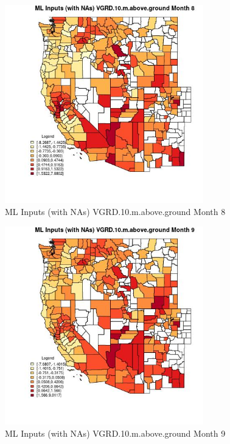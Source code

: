 \begin{figure} 
\centering  
\includegraphics[width=0.77\textwidth]{Code_Outputs/Report_ML_input_PM25_Step4_part_f_de_duplicated_aves_prioritize_24hr_obswNAs_CountyVGRD10mabovegroundmedianMonth8.jpg} 
\caption{\label{fig:Report_ML_input_PM25_Step4_part_f_de_duplicated_aves_prioritize_24hr_obswNAsCountyVGRD10mabovegroundmedianMonth8}ML Inputs (with NAs) VGRD.10.m.above.ground Month 8} 
\end{figure} 
 

\begin{figure} 
\centering  
\includegraphics[width=0.77\textwidth]{Code_Outputs/Report_ML_input_PM25_Step4_part_f_de_duplicated_aves_prioritize_24hr_obswNAs_CountyVGRD10mabovegroundmedianMonth9.jpg} 
\caption{\label{fig:Report_ML_input_PM25_Step4_part_f_de_duplicated_aves_prioritize_24hr_obswNAsCountyVGRD10mabovegroundmedianMonth9}ML Inputs (with NAs) VGRD.10.m.above.ground Month 9} 
\end{figure} 
 

